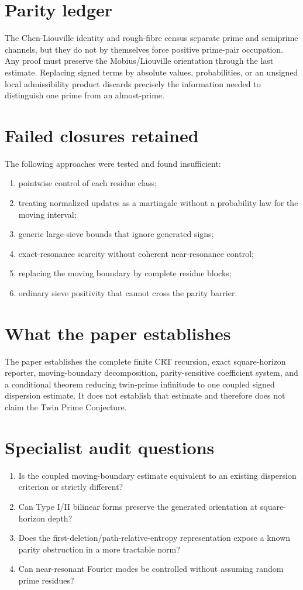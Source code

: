 \documentclass[11pt,a4paper]{article}
\begin{document}
\section{Parity ledger}
The Chen-Liouville identity and rough-fibre census separate prime and semiprime channels, but they do not by themselves force positive prime-pair occupation. Any proof must preserve the Mobius/Liouville orientation through the last estimate. Replacing signed terms by absolute values, probabilities, or an unsigned local admissibility product discards precisely the information needed to distinguish one prime from an almost-prime.

\section{Failed closures retained}
The following approaches were tested and found insufficient:
\begin{enumerate}
\item pointwise control of each residue class;
\item treating normalized updates as a martingale without a probability law for the moving interval;
\item generic large-sieve bounds that ignore generated signs;
\item exact-resonance scarcity without coherent near-resonance control;
\item replacing the moving boundary by complete residue blocks;
\item ordinary sieve positivity that cannot cross the parity barrier.
\end{enumerate}

\section{What the paper establishes}
The paper establishes the complete finite CRT recursion, exact square-horizon reporter, moving-boundary decomposition, parity-sensitive coefficient system, and a conditional theorem reducing twin-prime infinitude to one coupled signed dispersion estimate. It does not establish that estimate and therefore does not claim the Twin Prime Conjecture.

\appendix
\section{Specialist audit questions}
\begin{enumerate}
\item Is the coupled moving-boundary estimate equivalent to an existing dispersion criterion or strictly different?
\item Can Type I/II bilinear forms preserve the generated orientation at square-horizon depth?
\item Does the first-deletion/path-relative-entropy representation expose a known parity obstruction in a more tractable norm?
\item Can near-resonant Fourier modes be controlled without assuming random prime residues?
\end{enumerate}
\end{document}
